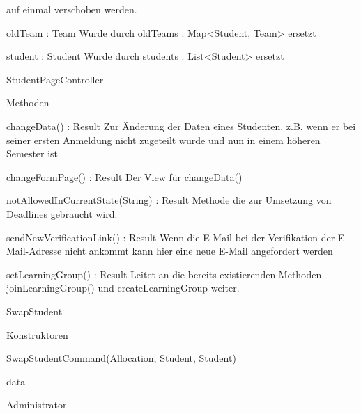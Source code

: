 \documentclass[parskip=full]{scrartcl}
\newcommand{\changeDescription}[1]{{\newline\color{black}\normalfont #1}}
\newcommand{\code}[1]{{\ttfamily #1}}
\begin{document}
\begin{itemPackage}
\begin{itemClass}
\begin{itemClassSub}
\begin{itemPlus}
{auf einmal verschoben werden.}
\end{itemPlus}
\begin{itemMinus}
\item oldTeam : Team \changeDescription{Wurde durch \code{oldTeams :
Map<Student, Team>} ersetzt}
\item student : Student \changeDescription{Wurde durch \code{students :
List<Student>} ersetzt }
\end{itemMinus}
\end{itemClassSub}
\item StudentPageController
\item 
\begin{itemClassSub}
\item Methoden
\begin{itemPlus}
\item changeData() : Result \changeDescription{Zur Änderung der Daten eines
Studenten, z.B. wenn er bei seiner ersten Anmeldung nicht zugeteilt wurde und
nun in einem höheren Semester ist}
\item changeFormPage() : Result \changeDescription{Der View für
\code{changeData()} }
\item notAllowedInCurrentState(String) : Result \changeDescription{Methode die
zur Umsetzung von Deadlines gebraucht wird.}
\item sendNewVerificationLink() : Result \changeDescription{Wenn die E-Mail bei
der Verifikation der E-Mail-Adresse nicht ankommt kann hier eine neue E-Mail
angefordert werden }
\item setLearningGroup() : Result \changeDescription{Leitet an die bereits
existierenden Methoden \code{joinLearningGroup()} und
\code{createLearningGroup} weiter.}
\end{itemPlus}
\end{itemClassSub}
\item SwapStudent
\begin{itemClassSub}
\item Konstruktoren
\begin{itemPlus}
\item SwapStudentCommand(Allocation, Student, Student) \changeDescription{}
\end{itemPlus}
\end{itemClassSub}
\end{itemClass}
\item data
\begin{itemClass}
\item Administrator
\begin{itemize}

\end{itemize}
\end{itemClass}
\end{itemPackage}
\end{document}
